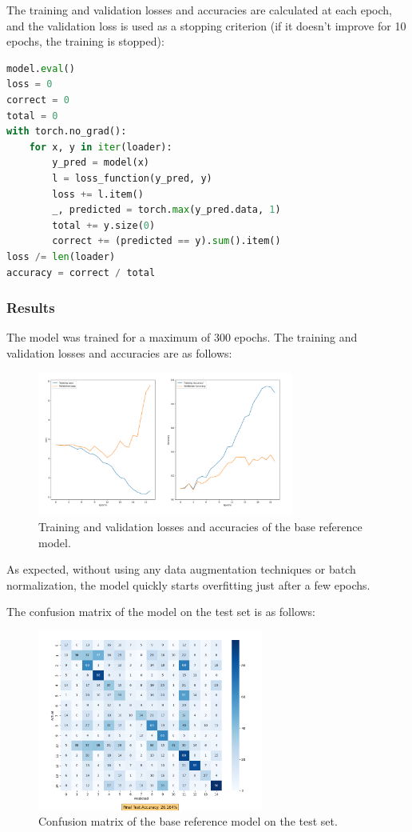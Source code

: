 \documentclass[a4paper, 11pt]{article}
\begin{document}
The training and validation losses and accuracies are calculated at each epoch, and the validation loss 
is used as a stopping criterion (if it doesn't improve for 10 epochs, the training is stopped):

\begin{lstlisting}[language=Python]
model.eval()
loss = 0
correct = 0
total = 0
with torch.no_grad():
    for x, y in iter(loader):
        y_pred = model(x)
        l = loss_function(y_pred, y)
        loss += l.item()
        _, predicted = torch.max(y_pred.data, 1)
        total += y.size(0)
        correct += (predicted == y).sum().item()
loss /= len(loader)
accuracy = correct / total
\end{lstlisting}

\subsubsection{Results}
The model was trained for a maximum of 300 epochs. 
The training and validation losses and accuracies are as follows:
\begin{figure}[h]
    \centering
    \includegraphics[width=0.75\textwidth]{loss_and_accuracy_task_1.png}
    \caption{Training and validation losses and accuracies of the base reference model.}
    \label{fig:task1_loss_accuracy}
\end{figure}

As expected, without using any data augmentation techniques or batch normalization, the model quickly starts overfitting just after a few epochs.

\pagebreak

The confusion matrix of the model on the test set is as follows:
\begin{figure}[h]
    \centering
    \includegraphics[width=0.66\textwidth]{confusion_matrix_task_1.png}
    \caption{Confusion matrix of the base reference model on the test set.}
    \label{fig:task1_confusion_matrix}
\end{figure}
\end{document}
